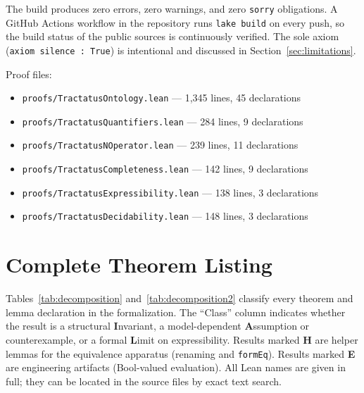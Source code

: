 \documentclass[jsl,bibother]{asl}
\theoremstyle{definition}
\theoremstyle{remark}
\begin{document}
\noindent
The build produces zero errors, zero warnings, and zero
\texttt{sorry} obligations.  A GitHub Actions workflow in the
repository runs \texttt{lake build} on every push, so the build
status of the public sources is continuously verified.  The sole axiom
(\texttt{axiom silence : True}) is intentional and
discussed in Section~\ref{sec:limitations}.

Proof files:
\begin{itemize}[nosep]
  \item \texttt{proofs/TractatusOntology.lean} --- 1,345 lines, 45 declarations
  \item \texttt{proofs/TractatusQuantifiers.lean} --- 284 lines, 9 declarations
  \item \texttt{proofs/TractatusNOperator.lean} --- 239 lines, 11 declarations
  \item \texttt{proofs/TractatusCompleteness.lean} --- 142 lines, 9 declarations
  \item \texttt{proofs/TractatusExpressibility.lean} --- 138 lines, 3 declarations
  \item \texttt{proofs/TractatusDecidability.lean} --- 148 lines, 3 declarations
\end{itemize}

\section{Complete Theorem Listing}
\label{app:theorems}

Tables~\ref{tab:decomposition} and~\ref{tab:decomposition2}
classify every theorem and lemma
declaration in the formalization.  The ``Class'' column indicates
whether the result is a structural \textbf{I}nvariant,
a model-dependent \textbf{A}ssumption or counterexample, or a
formal \textbf{L}imit on expressibility.  Results marked
\textbf{H} are helper lemmas for the equivalence apparatus
(renaming and \texttt{formEq}).
Results marked \textbf{E} are engineering artifacts
(Bool-valued evaluation).  All Lean names are given in full;
they can be located in the source files by exact text search.
\end{document}

